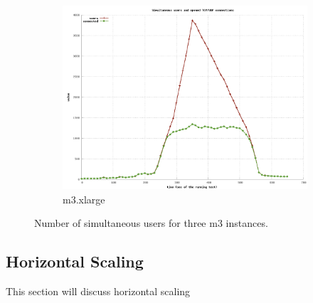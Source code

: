 \documentclass[dvips,12pt]{article}
\begin{document}
\begin{figure}[h!]
\begin{subfigure}[b]{0.3\textwidth}
        \includegraphics[width=\textwidth]{images/vertical/users_simul_xlarge.png}
        \caption{m3.xlarge}
    \end{subfigure}
    \caption{Number of simultaneous users for three m3 instances.}
\end{figure}




%

\newpage
\subsection{Horizontal Scaling}

This section will discuss horizontal scaling
\end{document}
